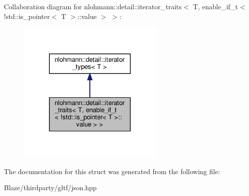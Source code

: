 Collaboration diagram for nlohmann\+:\+:detail\+:\+:iterator\+\_\+traits$<$ T, enable\+\_\+if\+\_\+t$<$ !std\+:\+:is\+\_\+pointer$<$ T $>$\+:\+:value $>$ $>$\+:\nopagebreak
\begin{figure}[H]
\begin{center}
\leavevmode
\includegraphics[width=204pt]{structnlohmann_1_1detail_1_1iterator__traits_3_01T_00_01enable__if__t_3_01_9std_1_1is__pointer_31de627e6351fc4d3947a52fbbc938280}
\end{center}
\end{figure}


The documentation for this struct was generated from the following file\+:\begin{DoxyCompactItemize}
\item 
Blaze/thirdparty/gltf/json.\+hpp\end{DoxyCompactItemize}
